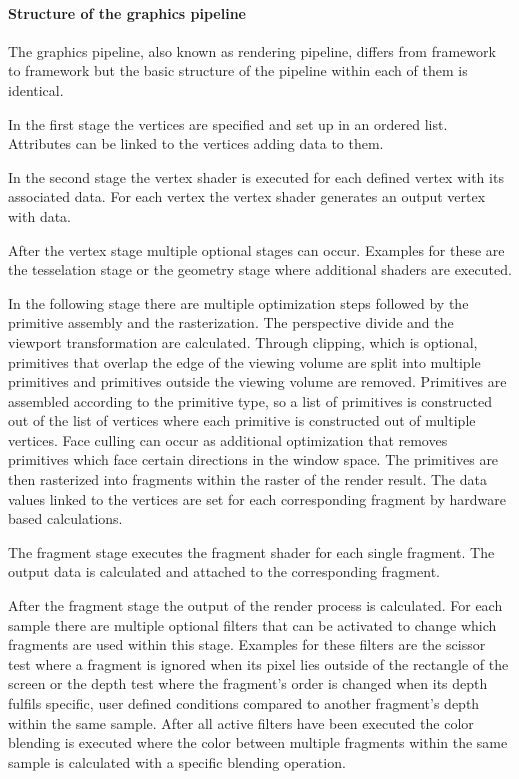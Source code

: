 \paragraph{Structure of the graphics pipeline}
\label{paragraph:pipeline}

The graphics pipeline, also known as rendering pipeline, differs from framework to framework but the basic structure of the pipeline within each of them is identical.

In the first stage the vertices are specified and set up in an ordered list. Attributes can be linked to the vertices adding data to them.

In the second stage the vertex shader is executed for each defined vertex with its associated data. For each vertex the vertex shader generates an output vertex with data.

After the vertex stage multiple optional stages can occur. Examples for these are the tesselation stage or the geometry stage where additional shaders are executed.

In the following stage there are multiple optimization steps followed by the primitive assembly and the rasterization. The perspective divide and the viewport transformation are calculated. Through clipping, which is optional, primitives that overlap the edge of the viewing volume are split into multiple primitives and primitives outside the viewing volume are removed. Primitives are assembled according to the primitive type, so a list of primitives is constructed out of the list of vertices where each primitive is constructed out of multiple vertices. Face culling can occur as additional optimization that removes primitives which face certain directions in the window space. The primitives are then rasterized into fragments within the raster of the render result. The data values linked to the vertices are set for each corresponding fragment by hardware based calculations.

The fragment stage executes the fragment shader for each single fragment. The output data is calculated and attached to the corresponding fragment.

After the fragment stage the output of the render process is calculated. For each sample there are multiple optional filters that can be activated to change which fragments are used within this stage. Examples for these filters are the scissor test where a fragment is ignored when its pixel lies outside of the rectangle of the screen or the depth test where the fragment's order is changed when its depth fulfils specific, user defined conditions compared to another fragment's depth within the same sample. After all active filters have been executed the color blending is executed where the color between multiple fragments within the same sample is calculated with a specific blending operation.

